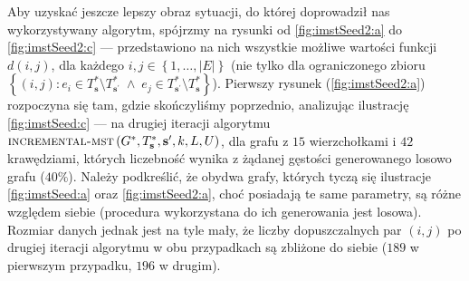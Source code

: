 Aby uzyskać jeszcze lepszy obraz sytuacji, do której doprowadził nas wykorzystywany algorytm, spójrzmy na rysunki od \ref{fig:imstSeed2:a} do \ref{fig:imstSeed2:c} --- przedstawiono na nich wszystkie możliwe wartości funkcji $d \left( i, j \right)$, dla każdego $i, j \in \left\{ 1, \dots, \left| E \right| \right\}$ (nie tylko dla ograniczonego zbioru $\left\{ \left( i, j \right) : e_{i} \in T^{\ast}_{\textbf{s}} \setminus T^{\ast}_{\textbf{s}^{\prime}} \; \wedge \; e_{j} \in T^{\ast}_{\textbf{s}^{\prime}} \setminus T^{\ast}_{\textbf{s}} \right\}$). Pierwszy rysunek (\ref{fig:imstSeed2:a}) rozpoczyna się tam, gdzie skończyliśmy poprzednio, analizując ilustrację \ref{fig:imstSeed:c} --- na drugiej iteracji algorytmu $\textsc{incremental-mst} \left( G^{\ast}, T^{\ast}_{\textbf{s}}, \textbf{s}^{\prime}, k, L, U \right)$, dla grafu z $15$ wierzchołkami i $42$ krawędziami, których liczebność wynika z żądanej gęstości generowanego losowo grafu ($40\%$). Należy podkreślić, że obydwa grafy, których tyczą się ilustracje \ref{fig:imstSeed:a} oraz \ref{fig:imstSeed2:a}, choć posiadają te same parametry, są różne  względem siebie (procedura wykorzystana do ich generowania jest losowa). Rozmiar danych jednak jest na tyle mały, że liczby dopuszczalnych par $\left( i, j \right)$ po drugiej iteracji algorytmu w obu przypadkach są zbliżone do siebie ($189$ w pierwszym przypadku, $196$ w drugim).

